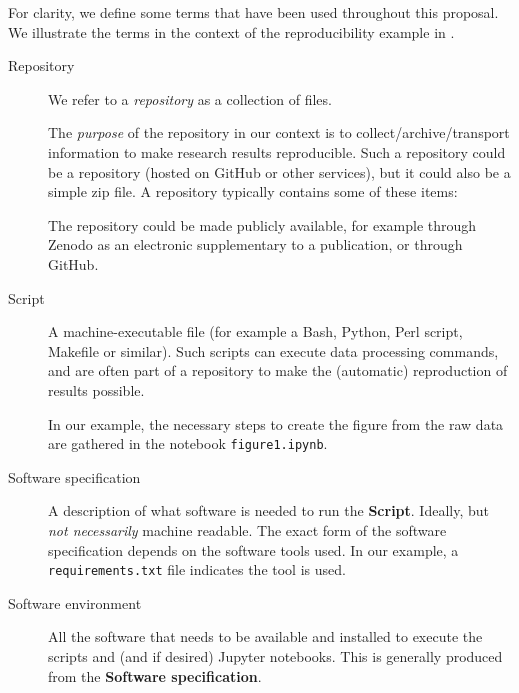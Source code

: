 \begin{terminology}{}
For clarity, we define some terms that have been used
throughout this proposal. We illustrate the terms in the context of the
reproducibility example in .

\begin{description}
\item[Repository] We refer to a \emph{repository} as a collection of files.

The \emph{purpose} of the repository in our context is to collect/archive/transport information to make
research results reproducible.
Such a repository could be a  repository (hosted on GitHub or other services),
but it could also be a simple zip file.
A repository typically contains some of these items:


The repository could be made publicly available,
for example through Zenodo
as an electronic supplementary to a publication,
or through GitHub.

\item[Script] A machine-executable file (for example a Bash, Python, Perl
script, Makefile or similar). Such scripts can execute data processing commands,
and are often part of a repository to make the (automatic) reproduction of
results possible.

In our example, the necessary steps to create the figure from the raw data are
gathered in the notebook \texttt{figure1.ipynb}.

\item[Software specification] A description of what software is needed to run the \textbf{Script}.
  Ideally, but \emph{not necessarily} machine readable.
  The exact form of the software specification depends on the software tools used.
  In our example, a \texttt{requirements.txt} file indicates the  tool is used.

\item[Software environment] All the software that needs to be available and
  installed to execute the scripts and (and if desired) Jupyter notebooks.
  This is generally produced from the \textbf{Software specification}.
\end{description}
\end{terminology}




